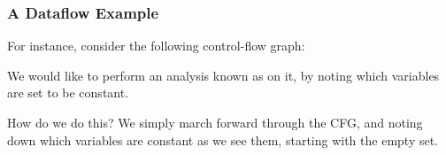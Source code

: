 \documentclass[aspectratio=169, handout]{beamer}
\begin{document}
\begin{frame}[fragile]
  \frametitle{A Dataflow Example}

  \begin{center}
    \begin{minipage}{0.65\textwidth}
      \raggedright
      For instance, consider the following control-flow graph:

      \vspace{10pt}

      We would like to perform an analysis known as 
      on it, by noting which variables are set to be constant.

      \vspace{10pt}

      How do we do this? We simply march forward through the CFG, and noting
      down which variables are constant as we see them, starting with the
      empty set.
    \end{minipage}
    \begin{minipage}{0.3\textwidth}
      \centering
    \end{minipage}
  \end{center}

\end{frame}
\end{document}
